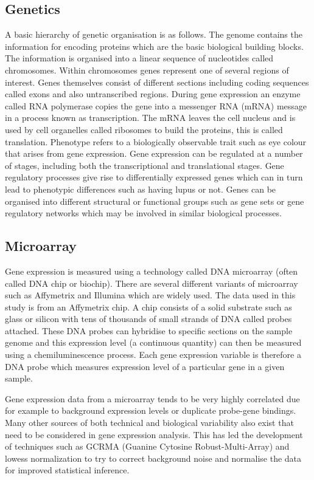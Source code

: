 \documentclass[a4paper, 12pt]{report}
\begin{document}
\subsection*{Genetics}
A basic hierarchy of genetic organisation is as follows. The genome contains the information for encoding proteins which are the basic biological building blocks. The information is organised into a linear sequence of nucleotides called chromosomes. Within chromosomes genes represent one of several regions of interest. Genes themselves consist of different sections including coding sequences called exons and also untranscribed regions. During gene expression an enzyme called RNA polymerase copies the gene into a messenger RNA (mRNA) message in a process known as transcription. The mRNA  leaves the cell nucleus and is used by cell organelles called ribosomes to build the proteins, this is called translation.  Phenotype refers to a biologically observable trait such as eye colour that arises from gene expression.  Gene expression can be regulated at a number of stages, including both the transcriptional and translational stages. Gene regulatory processes give rise to differentially expressed genes which can in turn lead to phenotypic differences such as having lupus or not. Genes can be organised into different structural or functional groups such as gene sets or gene regulatory networks which may be involved in similar biological processes.

\subsection*{Microarray}
Gene expression is measured using a technology called DNA microarray (often called DNA chip or biochip). There are several different variants of microarray such as Affymetrix and Illumina which are widely used. The data used in this study is from an Affymetrix chip.  A chip consists of a solid substrate such as glass or silicon with tens of thousands of small strands of DNA called probes attached. These DNA probes can hybridise to specific sections on the sample genome and this expression level (a continuous quantity) can then be measured using a chemiluminescence process. Each gene expression variable is therefore a DNA probe which measures expression level of a particular gene in a given sample.

 Gene expression data from a microarray tends to be very highly correlated due for example to background expression levels or duplicate probe-gene bindings. Many other sources of both technical and biological variability also exist that need to be considered in gene expression analysis. This has led the development of techniques such as GCRMA (Guanine Cytosine Robust-Multi-Array) \cite{GCRMA} and lowess normalization \cite{microarray} to try to correct background noise and normalise the data for improved statistical inference.
\end{document}
